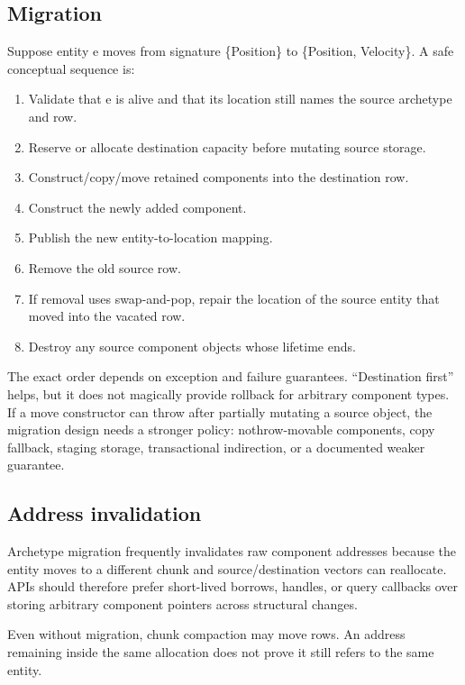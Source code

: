 \subsection{Migration}\label{appendix-fbfeb0430008-migration}

Suppose entity e moves from signature \{Position\} to \{Position, Velocity\}. A safe conceptual sequence is:

\begin{enumerate}
\def\labelenumi{\arabic{enumi}.}
\tightlist
\item
  Validate that e is alive and that its location still names the source archetype and row.
\item
  Reserve or allocate destination capacity before mutating source storage.
\item
  Construct/copy/move retained components into the destination row.
\item
  Construct the newly added component.
\item
  Publish the new entity-to-location mapping.
\item
  Remove the old source row.
\item
  If removal uses swap-and-pop, repair the location of the source entity that moved into the vacated row.
\item
  Destroy any source component objects whose lifetime ends.
\end{enumerate}

The exact order depends on exception and failure guarantees. ``Destination first'' helps, but it does not magically provide rollback for arbitrary component types. If a move constructor can throw after partially mutating a source object, the migration design needs a stronger policy: nothrow-movable components, copy fallback, staging storage, transactional indirection, or a documented weaker guarantee.

\subsection{Address invalidation}\label{appendix-fbfeb0430008-address-invalidation}

Archetype migration frequently invalidates raw component addresses because the entity moves to a different chunk and source/destination vectors can reallocate. APIs should therefore prefer short-lived borrows, handles, or query callbacks over storing arbitrary component pointers across structural changes.

Even without migration, chunk compaction may move rows. An address remaining inside the same allocation does not prove it still refers to the same entity.

